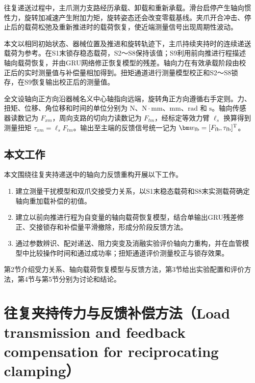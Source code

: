往复递送过程中，主爪测力支路经历承载、卸载和重新承载。滑台启停产生轴向惯性力，旋转加减速产生附加力矩，旋转姿态还会改变零载基线。夹爪开合冲击、停止后的载荷松弛及重新推进时的载荷恢复，使近端测量信号出现周期性波动。





本文以相同初始状态、器械位置及推进和旋转轨迹下，主爪持续夹持时的连续递送载荷为参考。在S1末锁存稳态载荷，S2～S8保持该值；S9利用前向推进行程描述轴向载荷恢复，并由GRU网络修正恢复模型的残差。轴向力在有效承载阶段由校正后的实时测量值与补偿量相加得到。扭矩通道进行测量模型校正和S2～S8锁存，在S9恢复输出校正后的测量值。





全文设轴向正方向沿器械名义中心轴指向远端，旋转角正方向遵循右手定则。力、扭矩、位移、角位移和时间的单位分别为 $\mathrm{N}$、$\mathrm{N}\cdot\mathrm{mm}$、$\mathrm{mm}$、$\mathrm{rad}$ 和 $\mathrm{s}$。轴向传感器读数记为 $F_{xm}$，周向支路的切向力读数记为 $F_{tm}$，经标定等效力臂 $\ell_s$ 换算得到测量扭矩 $\tau_{xm}=\ell_sF_{tm}$。输出至主端的反馈信号统一记为 $\bm w_{\mathrm{fb}}=[F_{\mathrm{fb}},\tau_{\mathrm{fb}}]^{\rm T}$。




\subsection{本文工作}


本文围绕往复夹持递送中的轴向力反馈重构开展以下工作。
\begin{enumerate}
\item 建立测量干扰模型和双爪交接受力关系，以S1末稳态载荷和S8末实测载荷确定轴向重加载补偿的初值。
\item 建立以前向推进行程为自变量的轴向载荷恢复模型，结合单输出GRU残差修正、交接锁存和补偿量平滑撤除，形成分阶段反馈方法。
\item 通过参数辨识、配对递送、阻力突变及消融实验评价轴向力重构，并在血管模型中比较操作时间和通过成功率；扭矩通道评价测量校正与锁存效果。
\end{enumerate}





第2节介绍受力关系、轴向载荷恢复模型与反馈方法，第3节给出实验配置和评价方法，第4节与第5节分别为讨论和结论。





\section{往复夹持传力与反馈补偿方法（Load transmission and feedback compensation for reciprocating clamping）}




